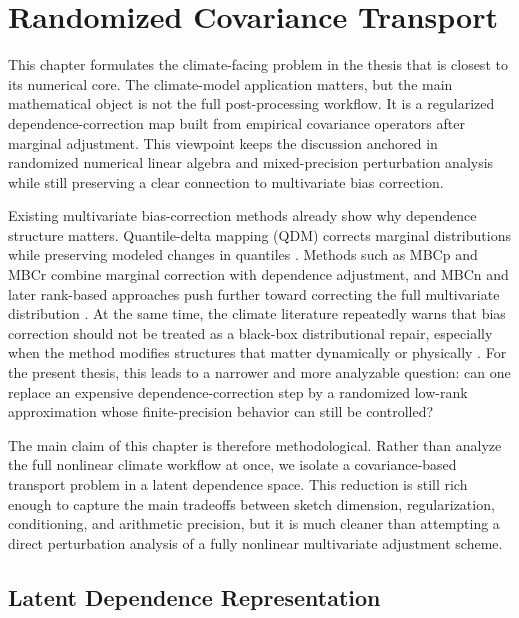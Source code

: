 \chapter{Randomized Covariance Transport} \label{ch:randcovtransport}

This chapter formulates the climate-facing problem in the thesis that is closest to its numerical core. The climate-model application matters, but the main mathematical object is not the full post-processing workflow. It is a regularized dependence-correction map built from empirical covariance operators after marginal adjustment. This viewpoint keeps the discussion anchored in randomized numerical linear algebra and mixed-precision perturbation analysis while still preserving a clear connection to multivariate bias correction.

Existing multivariate bias-correction methods already show why dependence structure matters. Quantile-delta mapping (QDM) corrects marginal distributions while preserving modeled changes in quantiles \cite{cannon2015qdm}. Methods such as MBCp and MBCr combine marginal correction with dependence adjustment, and MBCn and later rank-based approaches push further toward correcting the full multivariate distribution \cite{cannon2016mbc,cannon2018mbcn,vrac2015ecbc,vrac2018r2d2}. At the same time, the climate literature repeatedly warns that bias correction should not be treated as a black-box distributional repair, especially when the method modifies structures that matter dynamically or physically \cite{maraun2016biasreview}. For the present thesis, this leads to a narrower and more analyzable question: can one replace an expensive dependence-correction step by a randomized low-rank approximation whose finite-precision behavior can still be controlled?

The main claim of this chapter is therefore methodological. Rather than analyze the full nonlinear climate workflow at once, we isolate a covariance-based transport problem in a latent dependence space. This reduction is still rich enough to capture the main tradeoffs between sketch dimension, regularization, conditioning, and arithmetic precision, but it is much cleaner than attempting a direct perturbation analysis of a fully nonlinear multivariate adjustment scheme.

\section{Latent Dependence Representation}

